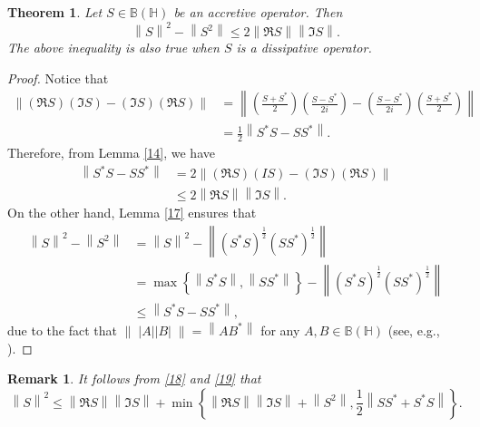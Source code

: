 \documentclass[12pt,twoside,reqno]{amsart}
\newtheorem{theorem}{Theorem}[section]
\newtheorem{remark}{Remark}[section]
\numberwithin{equation}{section}
\begin{document}
\begin{theorem}
Let $S\in \mathbb B\left( \mathbb H \right)$ be an accretive operator. Then
\begin{equation}\label{19}
{{\left\| S \right\|}^{2}}-\left\| {{S}^{2}} \right\|\le 2\left\| \Re S \right\|\left\| \Im S \right\|.
\end{equation}
The above inequality is also true when $S$ is a dissipative operator.
\end{theorem}
\begin{proof}
Notice that
\[\begin{aligned}
   \left\| \left( \Re S \right)\left( \Im S \right)-\left( \Im S \right)\left( \Re S \right) \right\|&=\left\| \left( \frac{S+{{S}^{*}}}{2} \right)\left( \frac{S-{{S}^{*}}}{2i} \right)-\left( \frac{S-{{S}^{*}}}{2i} \right)\left( \frac{S+{{S}^{*}}}{2} \right) \right\| \\ 
 & =\frac{1}{2}\left\| {{S}^{*}}S-S{{S}^{*}} \right\|.  
\end{aligned}\]
Therefore, from Lemma \ref{14}, we have
\[\begin{aligned}
   \left\| {{S}^{*}}S-S{{S}^{*}} \right\|&=2\left\| \left( \Re S \right)\left( IS \right)-\left( \Im S \right)\left( \Re S \right) \right\| \\ 
 & \le 2\left\| \Re S \right\|\left\| \Im S \right\|.  
\end{aligned}\]
On the other hand, Lemma \ref{17} ensures that
\[\begin{aligned}
   {{\left\| S \right\|}^{2}}-\left\| {{S}^{2}} \right\|&={{\left\| S \right\|}^{2}}-\left\| {{\left( {{S}^{*}}S \right)}^{\frac{1}{2}}}{{\left( S{{S}^{*}} \right)}^{\frac{1}{2}}} \right\| \\ 
 & =\max \left\{ \left\| {{S}^{*}}S \right\|,\left\| S{{S}^{*}} \right\| \right\}-\left\| {{\left( {{S}^{*}}S \right)}^{\frac{1}{2}}}{{\left( S{{S}^{*}} \right)}^{\frac{1}{2}}} \right\| \\ 
 & \le \left\| {{S}^{*}}S-S{{S}^{*}} \right\|,  
\end{aligned}\]
due to the fact that $\left\| \;\left| A \right|\left| B \right| \;\right\|=\left\| A{{B}^{*}} \right\|$ for any $A,B\in \mathbb B\left( \mathbb H \right)$ (see, e.g., \cite[(8)]{Kittaneh2004}).
\end{proof}




\begin{remark}
It follows from \eqref{18} and \eqref{19} that
\[{{\left\| S \right\|}^{2}}\le \left\| \Re S \right\|\left\| \Im S \right\|+\min \left\{ \left\| \Re S \right\|\left\| \Im S \right\|+\left\| {{S}^{2}} \right\|,\frac{1}{2}\left\| S{{S}^{*}}+{{S}^{*}}S \right\| \right\}.\]
\end{remark}
\end{document}
